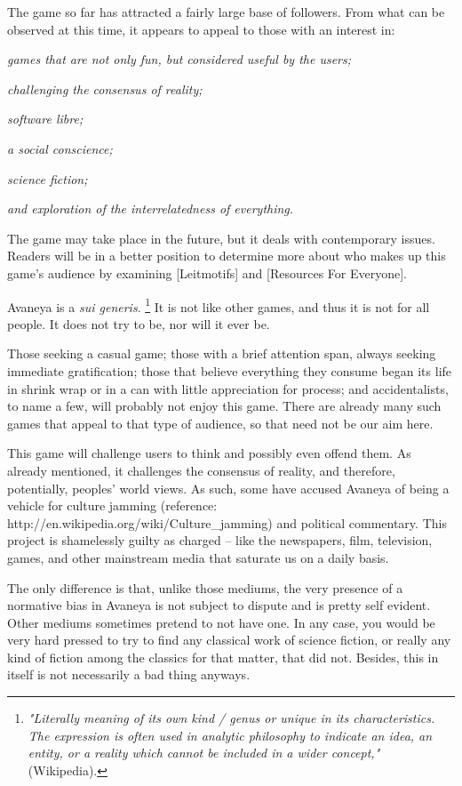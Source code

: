 The game so far has attracted a fairly large base of followers. From what can be observed at this time, it appears to appeal to those with an interest in:

\startitemize[4]
\item
{\it games that are not only fun, but considered useful by the users;}
\item
{\it challenging the consensus of reality;}
\item
{\it software libre;}
\item
{\it a social conscience;}
\item
{\it science fiction;}
\item
{\it and exploration of the interrelatedness of everything.}
\stopitemize

The game may take place in the future, but it deals with contemporary issues. Readers will be in a better position to determine more about who makes up this game's audience by examining [Leitmotifs] and [Resources For Everyone].

Avaneya is a {\it sui generis}. \footnote{{\it "Literally meaning of its own kind / genus or unique in its characteristics. The expression is often used in analytic philosophy to indicate an idea, an entity, or a reality which cannot be included in a wider concept,"} (Wikipedia).} It is not like other games, and thus it is not for all people. It does not try to be, nor will it ever be.

Those seeking a casual game; those with a brief attention span, always seeking immediate gratification; those that believe everything they consume began its life in shrink wrap or in a can with little appreciation for process; and accidentalists, to name a few, will probably not enjoy this game. There are already many such games that appeal to that type of audience, so that need not be our aim here.

This game will challenge users to think and possibly even offend them. As already mentioned, it challenges the consensus of reality, and therefore, potentially, peoples' world views. As such, some have accused Avaneya of being a vehicle for culture jamming (reference: http://en.wikipedia.org/wiki/Culture_jamming) and political commentary. This project is shamelessly guilty as charged -- like the newspapers, film, television, games, and other mainstream media that saturate us on a daily basis. 

The only difference is that, unlike those mediums, the very presence of a normative bias in Avaneya is not subject to dispute and is pretty self evident. Other mediums sometimes pretend to not have one. In any case, you would be very hard pressed to try to find any classical work of science fiction, or really any kind of fiction among the classics for that matter, that did not. Besides, this in itself is not necessarily a bad thing anyways.

